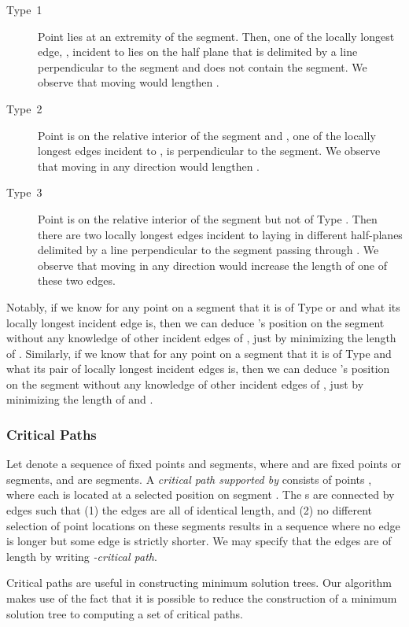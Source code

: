 \begin{description}
\item[Type~1] Point  lies at an extremity of the segment. Then,
  one of the locally longest edge, , incident to   lies on
  the half plane that is delimited by a line perpendicular to the segment and
  does not contain the segment.
    We observe that moving  would lengthen .
 \item[Type~2] Point  is on the relative interior of the segment and ,
one of the locally longest edges incident to ,
  is perpendicular to the segment. We observe that moving  in any direction
  would lengthen .
\item[Type~3] Point  is on the relative interior of the segment but not of Type .
  Then there are two locally longest edges incident to  laying in different half-planes delimited by a
  line perpendicular to the segment passing through . We observe that moving  in any direction would increase the length of one of these two edges.
\end{description}
Notably, if we know for any point  on a segment that it is of  Type  or  and what its locally longest incident edge  is, then we can deduce 's position on the segment without any knowledge of other incident edges of , just by minimizing the length of .
Similarly, if we know that for any point  on a segment that it  is of Type  and what its pair of locally longest  incident edges  is, then we can deduce 's position on the segment without any knowledge of other incident edges of , just by minimizing the length of  and .



\subsubsection*{Critical Paths}
Let  denote a  sequence of fixed points and segments, where  and  are fixed points or segments, and   are segments.
A {\em critical path supported by}  consists of
points , where each  is located at a selected
position on segment . The s are connected by edges 
such that (1) the edges are all of identical length, and (2) no
different selection of point locations on these segments results in a
sequence where no edge is longer but some edge is strictly shorter.
We may specify that the edges are of length  by writing
\emph{-critical path}.

Critical paths are useful in constructing minimum solution trees. Our algorithm makes use of the fact that it is possible to reduce the construction of  a minimum solution tree to computing a set of critical paths.

